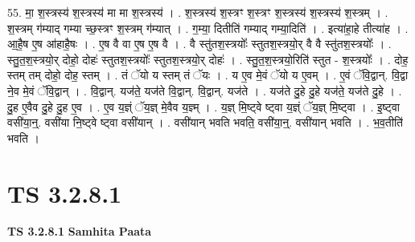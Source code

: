 \documentclass[17pt]{extarticle}
\begin{document}
55. मा॒ श॒स्त्रस्य॑ श॒स्त्रस्य॑ मा मा श॒स्त्रस्य॑ । . श॒स्त्रस्य॑ श॒स्त्रꣳ श॒स्त्रꣳ श॒स्त्रस्य॑ श॒स्त्रस्य॑ श॒स्त्रम् । . श॒स्त्रम् ग॑म्याद् गम्या च्छ॒स्त्रꣳ श॒स्त्रम् ग॑म्यात् । . ग॒म्या॒ दितीति॑ गम्याद् गम्या॒दिति॑ । . इत्या॑हा॒हे तीत्या॑ह । . आ॒है॒ष ए॒ष आ॑हाहै॒षः । . ए॒ष वै वा ए॒ष ए॒ष वै । . वै स्तु॑तश॒स्त्रयोः᳚ स्तुतश॒स्त्रयो॒र् वै वै स्तु॑तश॒स्त्रयोः᳚ । . स्तु॒त॒श॒स्त्रयो॒र् दोहो॒ दोहः॑ स्तुतश॒स्त्रयोः᳚ स्तुतश॒स्त्रयो॒र् दोहः॑ । . स्तु॒त॒श॒स्त्रयो॒रिति॑ स्तुत - श॒स्त्रयोः᳚ । . दोह॒ स्तम् तम् दोहो॒ दोह॒ स्तम् । . तं ॅयो य स्तम् तं ॅयः । . य ए॒व मे॒वं ॅयो य ए॒वम् । . ए॒वं ॅवि॒द्वान्. वि॒द्वा ने॒व मे॒वं ॅवि॒द्वान् । . वि॒द्वान्. यज॑ते॒ यज॑ते वि॒द्वान्. वि॒द्वान्. यज॑ते । . यज॑ते दु॒हे दु॒हे यज॑ते॒ यज॑ते दु॒हे । . दु॒ह ए॒वैव दु॒हे दु॒ह ए॒व । . ए॒व य॒ज्ञ्ं ॅय॒ज्ञ् मे॒वैव य॒ज्ञ्म् । . य॒ज्ञ् मि॒ष्ट्वे ष्ट्वा य॒ज्ञ्ं ॅय॒ज्ञ् मि॒ष्ट्वा । . इ॒ष्ट्वा वसी॑या॒न्॒. वसी॑या नि॒ष्ट्वे ष्ट्वा वसी॑यान् । . वसी॑यान् भवति भवति॒ वसी॑या॒न्॒. वसी॑यान् भवति । . भ॒व॒तीति॑ भवति । \newline


\section{ TS 3.2.8.1 }

\textbf{TS 3.2.8.1 } \newline
\textbf{Samhita Paata} \newline
\end{document}
